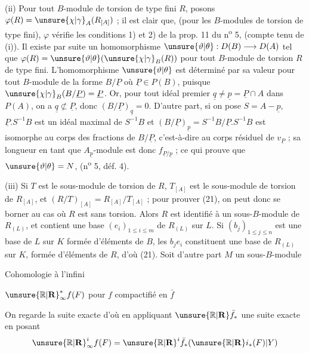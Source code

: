 (ii) Pour tout $B$-module de torsion de type fini $R$, posons $\varphi(R)=\unsure{\chi|\gamma}_A(R_{[A]})$ ; il est clair que, (pour les $B$-modules de torsion de type fini), $\varphi$ vérifie les conditions 1) et 2) de la prop. 11 du n\textsuperscript{o} 5, (compte tenu de (i)). Il existe par suite un homomorphisme $\unsure{\vartheta|\theta}:D(B)\longrightarrow D(A)$ tel que $\varphi(R)=\unsure{\vartheta|\theta}(\unsure{\chi|\gamma}_B(R))$ pour tout $B$-module de torsion $R$ de type fini. L'homomorphisme $\unsure{\vartheta|\theta}$ est déterminé par sa valeur pour tout $B$-module de la forme $B/\underline{P}$ où $\underline{P}\in P(B)$, puisque $\unsure{\chi|\gamma}_B(B/\underline{P})=\underline{P}$. Or, pour tout idéal premier $\underline{q}\ne\underline{p}=\underline{P}\cap A$ dans $P(A)$, on a $\underline{q}\not\subset\underline{P}$, donc $(B/\underline{P})_{\underline{q}}=0$. D'autre part, si on pose $S=A-\underline{p}$, $\underline{P}.S^{-1}B$ est un idéal maximal de $S^{-1}B$ et $(B/\underline{P})_{\underline{p}}=S^{-1}B/\underline{P}.S^{-1}B$ est isomorphe au corps des fractions de $B/\underline{P}$, c'est-à-dire au corps résiduel de $v_{\underline{P}}$ ; sa longueur en tant que $A_{\underline{p}}$-module est donc $f_{\underline{P}/\underline{p}}$ ; ce qui prouve que $\unsure{\vartheta|\theta}=N$, (n\textsuperscript{o} 5, déf. 4).

(iii) Si $T$ est le sous-module de torsion de $R$, $T_{[A]}$ est le sous-module de torsion de $R_{[A]}$, et $(R/T)_{[A]}=R_{[A]}/T_{[A]}$ ; pour prouver (21), on peut donc se borner au cas où $R$ est sans torsion. Alors $R$ est identifié à un sous-$B$-module de $R_{(L)}$, et contient une base $(e_i)_{1\le i\le m}$ de $R_{(L)}$ sur $L$. Si $(b_j)_{1\le j\le n}$ est une base de $L$ sur $K$ formée d'éléments de $B$, les $b_je_i$ constituent une base de $R_{(L)}$ sur $K$, formée d'éléments de $R$, d'où (21). Soit d'autre part $M$ un sous-$B$-module

Cohomologie à l'infini

$\unsure{\mathbb{R}|\mathbf{R}}^*_{\infty}f(F)$ pour $f$ compactifié en $\bar f$

On regarde la suite exacte
d'où en appliquant $\unsure{\mathbb{R}|\mathbf{R}}\bar f_*$ une suite exacte
en posant
\[
\unsure{\mathbb{R}|\mathbf{R}}^i_{\infty}f(F)=\unsure{\mathbb{R}|\mathbf{R}}^i\bar f_*(\unsure{\mathbb{R}|\mathbf{R}}i_*(F)|Y)
\]

